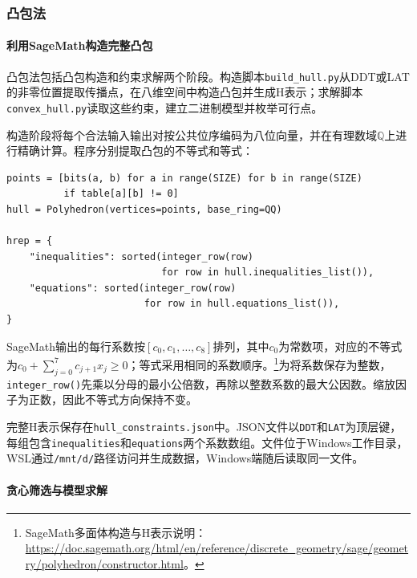 \clearpage
\subsubsection{凸包法}
\label{subsubsec:lab4-task1-convex-hull}

\paragraph{利用SageMath构造完整凸包}

凸包法包括凸包构造和约束求解两个阶段。构造脚本\texttt{build\_hull.py}从DDT或LAT的非零位置提取传播点，在八维空间中构造凸包并生成H表示；求解脚本\texttt{convex\_hull.py}读取这些约束，建立二进制模型并枚举可行点。

构造阶段将每个合法输入输出对按公共位序编码为八位向量，并在有理数域$\mathbb Q$上进行精确计算。程序分别提取凸包的不等式和等式：
\begin{lstlisting}
points = [bits(a, b) for a in range(SIZE) for b in range(SIZE)
          if table[a][b] != 0]
hull = Polyhedron(vertices=points, base_ring=QQ)

hrep = {
    "inequalities": sorted(integer_row(row)
                           for row in hull.inequalities_list()),
    "equations": sorted(integer_row(row)
                        for row in hull.equations_list()),
}
\end{lstlisting}

SageMath输出的每行系数按$[c_0,c_1,\ldots,c_8]$排列，其中$c_0$为常数项，对应的不等式为$c_0+\sum_{j=0}^{7}c_{j+1}x_j\ge0$；等式采用相同的系数顺序。\footnote{SageMath多面体构造与H表示说明：\url{https://doc.sagemath.org/html/en/reference/discrete_geometry/sage/geometry/polyhedron/constructor.html}。}为将系数保存为整数，\texttt{integer\_row()}先乘以分母的最小公倍数，再除以整数系数的最大公因数。缩放因子为正数，因此不等式方向保持不变。

完整H表示保存在\texttt{hull\_constraints.json}中。JSON文件以\texttt{DDT}和\texttt{LAT}为顶层键，每组包含\texttt{inequalities}和\texttt{equations}两个系数数组。文件位于Windows工作目录，WSL通过\texttt{/mnt/d/}路径访问并生成数据，Windows端随后读取同一文件。

\paragraph{贪心筛选与模型求解}

